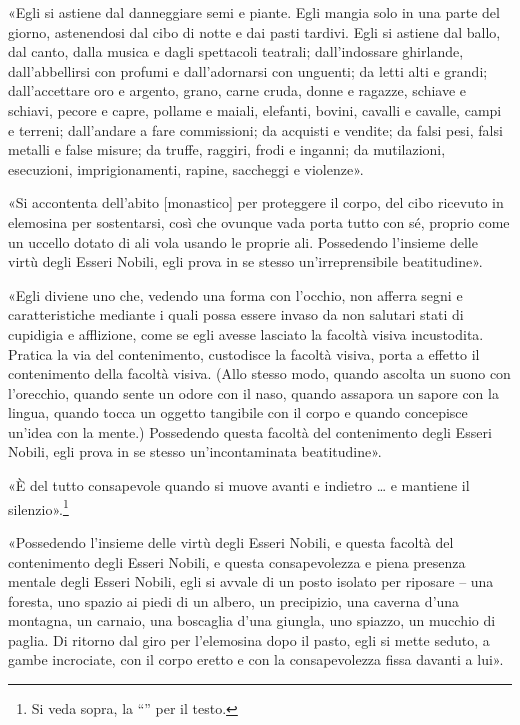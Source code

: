 «Egli si astiene dal danneggiare semi e piante. Egli mangia solo in una parte
del giorno, astenendosi dal cibo di notte e dai pasti tardivi. Egli si astiene
dal ballo, dal canto, dalla musica e dagli spettacoli teatrali; dall’indossare
ghirlande, dall’abbellirsi con profumi e dall’adornarsi con unguenti; da letti
alti e grandi; dall’accettare oro e argento, grano, carne cruda, donne e
ragazze, schiave e schiavi, pecore e capre, pollame e maiali, elefanti, bovini,
cavalli e cavalle, campi e terreni; dall’andare a fare commissioni; da acquisti
e vendite; da falsi pesi, falsi metalli e false misure; da truffe, raggiri,
frodi e inganni; da mutilazioni, esecuzioni, imprigionamenti, rapine, saccheggi
e violenze».

«Si accontenta dell’abito [monastico] per proteggere il corpo, del cibo ricevuto
in elemosina per sostentarsi, così che ovunque vada porta tutto con sé, proprio
come un uccello dotato di ali vola usando le proprie ali. Possedendo l’insieme
delle virtù degli Esseri Nobili, egli prova in se stesso un’irreprensibile
beatitudine».

«Egli diviene uno che, vedendo una forma con l’occhio, non afferra segni e
caratteristiche mediante i quali possa essere invaso da non salutari stati di
cupidigia e afflizione, come se egli avesse lasciato la facoltà visiva
incustodita. Pratica la via del contenimento, custodisce la facoltà visiva,
porta a effetto il contenimento della facoltà visiva. (Allo stesso modo, quando
ascolta un suono con l’orecchio, quando sente un odore con il naso, quando
assapora un sapore con la lingua, quando tocca un oggetto tangibile con il corpo
e quando concepisce un’idea con la mente.) Possedendo questa facoltà del
contenimento degli Esseri Nobili, egli prova in se stesso un’incontaminata
beatitudine».

«È del tutto consapevole quando si muove avanti e indietro … e mantiene il
silenzio».\footnote{Si veda sopra, la “\hyperlink{pag267}{}” per il testo.}

«Possedendo l’insieme delle virtù degli Esseri Nobili, e questa facoltà del
contenimento degli Esseri Nobili, e questa consapevolezza e piena presenza
mentale degli Esseri Nobili, egli si avvale di un posto isolato per riposare –
una foresta, uno spazio ai piedi di un albero, un precipizio, una caverna d’una
montagna, un carnaio, una boscaglia d’una giungla, uno spiazzo, un mucchio di
paglia. Di ritorno dal giro per l’elemosina dopo il pasto, egli si mette seduto,
a gambe incrociate, con il corpo eretto e con la consapevolezza fissa davanti a
lui».

